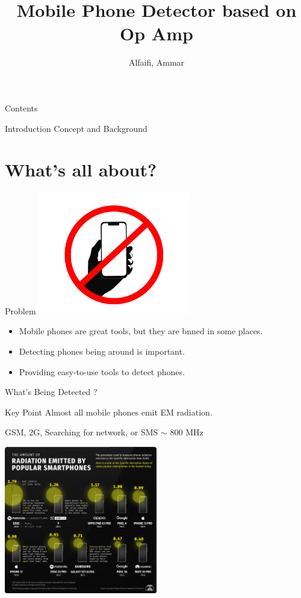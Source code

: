 \documentclass{loyola-beamer}
\title{Mobile Phone Detector based on Op Amp}
\author{Alfaifi, Ammar}
\institute{KFUPM}
\begin{document}
\begin{titleframe}{}
	\maketitle
\end{titleframe}

\begin{frame}{Contents}
	\tableofcontents
\end{frame}



\begin{titleframe}{Introduction}
	Concept and Background
\end{titleframe}

\section{What's all about?}

\begin{frame}{Problem}
	\includegraphics[width=0.5\textwidth]{../mobile-not-allowed.jpg}
	\begin{itemize}
		\item Mobile phones are great tools, but they are bnned in some places.
		\item Detecting phones being around is important.
		\item Providing  easy-to-use tools to detect phones.
	\end{itemize}
\end{frame}

\begin{frame}{What's Being Detected ?}
	\begin{block}{Key Point}
		Almost all mobile phones emit EM radiation.
	\end{block}

	GSM, 2G, Searching for network, or SMS $\sim$ 800 MHz

	\includegraphics[width=0.5\textwidth]{../Radiation.jpg}
\end{frame}
\end{document}
